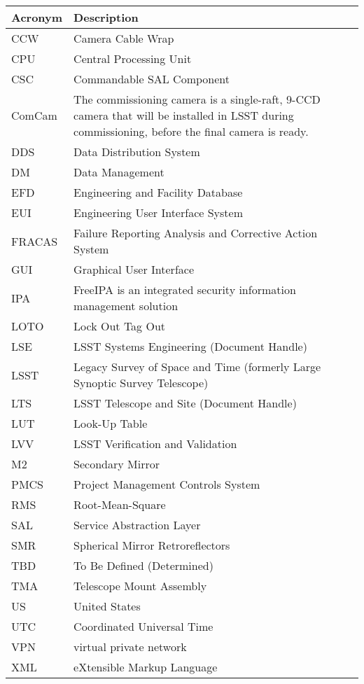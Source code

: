 \addtocounter{table}{-1}
\begin{longtable}{p{}p{}}\hline
\textbf{Acronym} & \textbf{Description}  \\\hline

CCW & Camera Cable Wrap \\\hline
CPU & Central Processing Unit \\\hline
CSC & Commandable SAL Component \\\hline
ComCam & The commissioning camera is a single-raft, 9-CCD camera that will be installed in LSST during commissioning, before the final camera is ready. \\\hline
DDS & Data Distribution System \\\hline
DM & Data Management \\\hline
EFD & Engineering and Facility Database \\\hline
EUI & Engineering User Interface System \\\hline
FRACAS & Failure Reporting Analysis and Corrective Action System \\\hline
GUI & Graphical User Interface \\\hline
IPA & FreeIPA is an integrated security information management solution \\\hline
LOTO & Lock Out Tag Out \\\hline
LSE & LSST Systems Engineering (Document Handle) \\\hline
LSST & Legacy Survey of Space and Time (formerly Large Synoptic Survey Telescope) \\\hline
LTS & LSST Telescope and Site  (Document Handle) \\\hline
LUT & Look-Up Table \\\hline
LVV & LSST Verification and Validation \\\hline
M2 & Secondary Mirror \\\hline
PMCS & Project Management Controls System \\\hline
RMS & Root-Mean-Square \\\hline
SAL & Service Abstraction Layer \\\hline
SMR & Spherical Mirror Retroreflectors \\\hline
TBD & To Be Defined (Determined) \\\hline
TMA & Telescope Mount Assembly \\\hline
US & United States \\\hline
UTC & Coordinated Universal Time \\\hline
VPN & virtual private network \\\hline
XML & eXtensible Markup Language \\\hline
\end{longtable}
